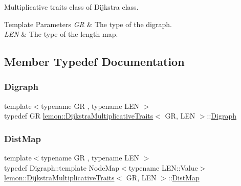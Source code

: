 Multiplicative traits class of Dijkstra class. 


\begin{DoxyTemplParams}{Template Parameters}
{\em GR} & The type of the digraph. \\
\hline
{\em L\+EN} & The type of the length map. \\
\hline
\end{DoxyTemplParams}


\subsection{Member Typedef Documentation}
\mbox{\label{structlemon_1_1_dijkstra_multiplicative_traits_a3ad6d100e3d5d097aaaac8e5733ce3a3}} 
\subsubsection{\texorpdfstring{Digraph}{Digraph}}
{\footnotesize\ttfamily template$<$typename GR , typename L\+EN $>$ \\
typedef GR \hyperlink{structlemon_1_1_dijkstra_multiplicative_traits}{lemon\+::\+Dijkstra\+Multiplicative\+Traits}$<$ GR, L\+EN $>$\+::\hyperlink{structlemon_1_1_dijkstra_multiplicative_traits_a3ad6d100e3d5d097aaaac8e5733ce3a3}{Digraph}}

\mbox{\label{structlemon_1_1_dijkstra_multiplicative_traits_a2bc3b74c3467b4762e2ac57ea68ef78e}} 
\subsubsection{\texorpdfstring{Dist\+Map}{DistMap}}
{\footnotesize\ttfamily template$<$typename GR , typename L\+EN $>$ \\
typedef Digraph\+::template Node\+Map$<$typename L\+E\+N\+::\+Value$>$ \hyperlink{structlemon_1_1_dijkstra_multiplicative_traits}{lemon\+::\+Dijkstra\+Multiplicative\+Traits}$<$ GR, L\+EN $>$\+::\hyperlink{structlemon_1_1_dijkstra_multiplicative_traits_a2bc3b74c3467b4762e2ac57ea68ef78e}{Dist\+Map}}

